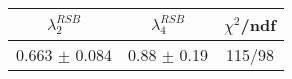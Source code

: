 \begin{tabular}{c|c||c}
$\lambda_{2}^{RSB}$ & $\lambda_4^{RSB}$ & $\chi^{2}$/ndf \\
\hline
0.663 $\pm$ 0.084 & 0.88 $\pm$ 0.19 & 115/98\\
\end{tabular}
